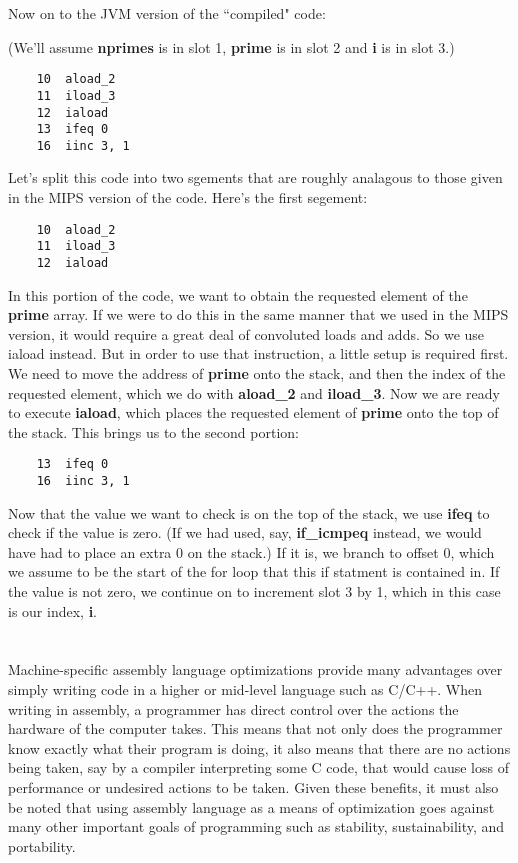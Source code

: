 \documentclass[11pt]{article}
\begin{document}

Now on to the JVM version of the ``compiled" code:

(We'll assume \textbf{nprimes} is in slot 1, \textbf{prime} is in slot 2 and \textbf{i} is in slot 3.)

\begin{verbatim}
    10  aload_2
    11  iload_3
    12  iaload
    13  ifeq 0
    16  iinc 3, 1
\end{verbatim}

Let's split this code into two sgements that are roughly analagous to those given in the MIPS version of the code. Here's the first segement:

\begin{verbatim}
    10  aload_2
    11  iload_3
    12  iaload
\end{verbatim}

In this portion of the code, we want to obtain the requested element of the \textbf{prime} array. If we were to do this in the same manner that we used in the MIPS version, it would require a great deal of convoluted loads and adds. So we use iaload instead. But in order to use that instruction, a little setup is required first. We need to move the address of \textbf{prime} onto the stack, and then the index of the requested element, which we do with \textbf{aload\_2} and \textbf{iload\_3}. Now we are ready to execute \textbf{iaload}, which places the requested element of \textbf{prime} onto the top of the stack. This brings us to the second portion:

\begin{verbatim}
    13  ifeq 0
    16  iinc 3, 1
\end{verbatim}

Now that the value we want to check is on the top of the stack, we use \textbf{ifeq} to check if the value is zero. (If we had used, say, \textbf{if\_icmpeq} instead, we would have had to place an extra 0 on the stack.) If it is, we branch to offset 0, which we assume to be the start of the for loop that this if statment is contained in. If the value is not zero, we continue on to increment slot 3 by 1, which in this case is our index, \textbf{i}.

\part{}


Machine-specific assembly language optimizations provide many advantages over simply writing code in a higher or mid-level language such as C/C++. When writing in assembly, a programmer has direct control over the actions the hardware of the computer takes. This means that not only does the programmer know exactly what their program is doing, it also means that there are no actions being taken, say by a compiler interpreting some C code, that would cause loss of performance or undesired actions to be taken. Given these benefits, it must also be noted that using assembly language as a means of optimization goes against many other important goals of programming such as stability, sustainability, and portability. 
\end{document}
